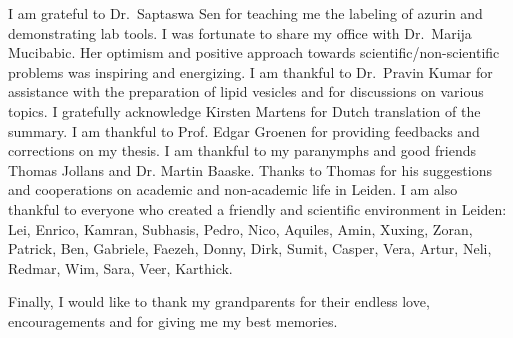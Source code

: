 I am grateful to Dr.~Saptaswa Sen for teaching me the labeling of azurin and demonstrating lab tools.
I was fortunate to share my office with Dr.~Marija Mucibabic. Her optimism and positive approach towards scientific/non-scientific problems was inspiring and energizing.
I am thankful to Dr.~Pravin Kumar for assistance with the preparation of lipid vesicles and for discussions on various topics.
I gratefully acknowledge Kirsten Martens for Dutch translation of the summary.
I am thankful to Prof. Edgar Groenen for providing feedbacks and corrections on my thesis.
I am thankful to my paranymphs and good friends Thomas Jollans and Dr. Martin Baaske.
Thanks to Thomas for his suggestions and cooperations on academic and non-academic life in Leiden.
I am also thankful to everyone who created a friendly and scientific environment in Leiden: Lei, Enrico, Kamran, Subhasis, Pedro, Nico, Aquiles, Amin, Xuxing, Zoran, Patrick, Ben, Gabriele, Faezeh, Donny, Dirk, Sumit, Casper, Vera, Artur, Neli, Redmar, Wim, Sara, Veer, Karthick.

Finally, I would like to thank my grandparents for their endless love, encouragements and for giving me my best memories.